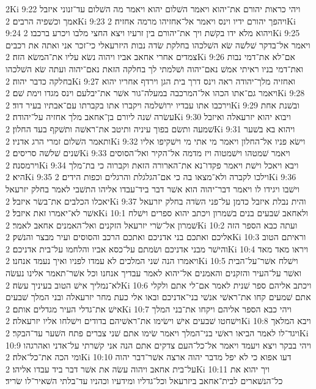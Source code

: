 2Ki 9:22  ויהי כראות יהורם את־יהוא ויאמר השׁלום יהוא ויאמר מה השׁלום עד־זנוני איזבל אמך וכשׁפיה הרבים׃
2Ki 9:23  ויהפך יהורם ידיו וינס ויאמר אל־אחזיהו מרמה אחזיה׃
2Ki 9:24  ויהוא מלא ידו בקשׁת ויך את־יהורם בין זרעיו ויצא החצי מלבו ויכרע ברכבו׃
2Ki 9:25  ויאמר אל־בדקר שׁלשׁה שׂא השׁלכהו בחלקת שׂדה נבות היזרעאלי כי־זכר אני ואתה את רכבים צמדים אחרי אחאב אביו ויהוה נשׂא עליו את־המשׂא הזה׃
2Ki 9:26  אם־לא את־דמי נבות ואת־דמי בניו ראיתי אמשׁ נאם־יהוה ושׁלמתי לך בחלקה הזאת נאם־יהוה ועתה שׂא השׁלכהו בחלקה כדבר יהוה׃
2Ki 9:27  ואחזיה מלך־יהודה ראה וינס דרך בית הגן וירדף אחריו יהוא ויאמר גם־אתו הכהו אל־המרכבה במעלה־גור אשׁר את־יבלעם וינס מגדו וימת שׁם׃
2Ki 9:28  וירכבו אתו עבדיו ירושׁלמה ויקברו אתו בקברתו עם־אבתיו בעיר דוד׃
2Ki 9:29  ובשׁנת אחת עשׂרה שׁנה ליורם בן־אחאב מלך אחזיה על־יהודה׃
2Ki 9:30  ויבוא יהוא יזרעאלה ואיזבל שׁמעה ותשׂם בפוך עיניה ותיטב את־ראשׁה ותשׁקף בעד החלון׃
2Ki 9:31  ויהוא בא בשׁער ותאמר השׁלום זמרי הרג אדניו׃
2Ki 9:32  וישׂא פניו אל־החלון ויאמר מי אתי מי וישׁקיפו אליו שׁנים שׁלשׁה סריסים׃
2Ki 9:33  ויאמר שׁמטהו וישׁמטוה ויז מדמה אל־הקיר ואל־הסוסים וירמסנה׃
2Ki 9:34  ויבא ויאכל וישׁת ויאמר פקדו־נא את־הארורה הזאת וקברוה כי בת־מלך היא׃
2Ki 9:35  וילכו לקברה ולא־מצאו בה כי אם־הגלגלת והרגלים וכפות הידים׃
2Ki 9:36  וישׁבו ויגידו לו ויאמר דבר־יהוה הוא אשׁר דבר ביד־עבדו אליהו התשׁבי לאמר בחלק יזרעאל יאכלו הכלבים את־בשׂר איזבל׃
2Ki 9:37  והית נבלת איזבל כדמן על־פני השׂדה בחלק יזרעאל אשׁר לא־יאמרו זאת איזבל׃
2Ki 10:1  ולאחאב שׁבעים בנים בשׁמרון ויכתב יהוא ספרים וישׁלח שׁמרון אל־שׂרי יזרעאל הזקנים ואל־האמנים אחאב לאמר׃
2Ki 10:2  ועתה כבא הספר הזה אליכם ואתכם בני אדניכם ואתכם הרכב והסוסים ועיר מבצר והנשׁק׃
2Ki 10:3  וראיתם הטוב והישׁר מבני אדניכם ושׂמתם על־כסא אביו והלחמו על־בית אדניכם׃
2Ki 10:4  ויראו מאד מאד ויאמרו הנה שׁני המלכים לא עמדו לפניו ואיך נעמד אנחנו׃
2Ki 10:5  וישׁלח אשׁר־על־הבית ואשׁר על־העיר והזקנים והאמנים אל־יהוא לאמר עבדיך אנחנו וכל אשׁר־תאמר אלינו נעשׂה לא־נמליך אישׁ הטוב בעיניך עשׂה׃
2Ki 10:6  ויכתב אליהם ספר שׁנית לאמר אם־לי אתם ולקלי אתם שׁמעים קחו את־ראשׁי אנשׁי בני־אדניכם ובאו אלי כעת מחר יזרעאלה ובני המלך שׁבעים אישׁ את־גדלי העיר מגדלים אותם׃
2Ki 10:7  ויהי כבא הספר אליהם ויקחו את־בני המלך וישׁחטו שׁבעים אישׁ וישׂימו את־ראשׁיהם בדודים וישׁלחו אליו יזרעאלה׃
2Ki 10:8  ויבא המלאך ויגד־לו לאמר הביאו ראשׁי בני־המלך ויאמר שׂימו אתם שׁני צברים פתח השׁער עד־הבקר׃
2Ki 10:9  ויהי בבקר ויצא ויעמד ויאמר אל־כל־העם צדקים אתם הנה אני קשׁרתי על־אדני ואהרגהו ומי הכה את־כל־אלה׃
2Ki 10:10  דעו אפוא כי לא יפל מדבר יהוה ארצה אשׁר־דבר יהוה על־בית אחאב ויהוה עשׂה את אשׁר דבר ביד עבדו אליהו׃
2Ki 10:11  ויך יהוא את כל־הנשׁארים לבית־אחאב ביזרעאל וכל־גדליו ומידעיו וכהניו עד־בלתי השׁאיר־לו שׂריד׃
